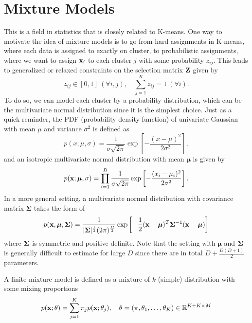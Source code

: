 \documentclass[../book-template.tex]{subfiles}
\begin{document}
\section{Mixture Models}
This is a field in statistics that is closely related to K-means. One way to motivate the idea of mixture models is to go from hard assignments in K-means, where each data is assigned to exactly on cluster, to probabilistic assignments, where we want to assign ${\bf x}_i$ to each cluster $j$ with some probability $z_{ij}$. This leads to generalized or relaxed constraints on the selection matrix ${\bf Z}$ given by
\begin{equation*}
	z_{ij}\in [0,1]\ (\forall i,j),\quad \sum_{j=1}^{K}z_{ij}=1\ (\forall i).
\end{equation*}
To do so, we can model each cluster by a probability distribution, which can be the multivariate normal distribution since it is the simplest choice. Just as a quick reminder, the PDF (probability density function) of univariate Gaussian with mean $\mu$ and variance $\sigma^2$ is defined as
\begin{equation*}
	p(x;\mu,\sigma)=\frac{1}{\sigma\sqrt{2\pi}}\exp\left[-\frac{(x-\mu)^2}{2\sigma^2}\right],
\end{equation*}
and an isotropic multivariate normal distribution with mean $\bm{\mu}$ is given by
\begin{equation*}
	p({\bf x};\bm{\mu},\sigma)=\prod_{i=1}^{D}\frac{1}{\sigma\sqrt{2\pi}}\exp\left[-\frac{(x_i-\mu_i)^2}{2\sigma^2}\right].
\end{equation*}
In a more general setting, a multivariate normal distribution with covariance matrix $\bm{\Sigma}$ takes the form of
\begin{equation*}
	p({\bf x},\bm{\mu},{\bf \Sigma})=\frac{1}{|{\bf \Sigma}|^{\frac{1}{2}}(2\pi)^{\frac{D}{2}}}\exp\left[-\frac{1}{2 }({\bf x}-\bm{\mu})^T{\bf \Sigma}^{-1}({\bf x}-\bm{\mu})\right]
\end{equation*}
where ${\bf \Sigma}$ is symmetric and positive definite. Note that the setting with $\bm{\mu}$ and ${\bf \Sigma}$ is generally difficult to estimate for large $D$ since there are in total $D+\frac{D(D+1)}{2}$ parameters.
\par A finite mixture model is defined as a mixture of $k$ (simple) distribution with some mixing proportions
\begin{equation*}
	p({\bf x};\theta)=\sum_{j=1}^{K}\pi_jp({\bf x};\theta_j),\quad \theta=(\pi,\theta_1,\dots,\theta_K)\in \mathbb{R}^{K+K\times M}
\end{equation*}
\end{document}
